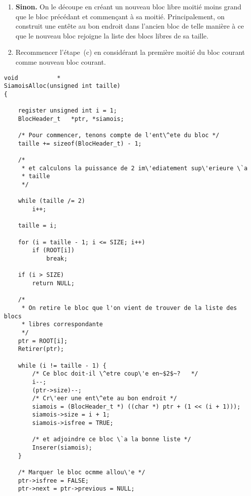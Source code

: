 \begin{enumerate}
\begin{enumerate}
    \verb+isfree+ \`a~$0$) et terminer la fonction en retournant un
    pointeur sur l'espace m\'emoire commen\c{c}ant juste apr\`es
    l'ent\^ete.
  \item \textbf{Sinon.}  On le d\'ecoupe en cr\'eant un nouveau bloc
    libre moiti\'e moins grand que le bloc pr\'ec\'edant et commen\c{c}ant
    \`a sa moiti\'e.  Principalement, on construit une ent\^ete au bon
    endroit dans l'ancien bloc de telle mani\`ere \`a ce que le
    nouveau bloc rejoigne la liste des blocs libres de sa taille.
  \item Recommencer l'\'etape~(c) en consid\'erant la premi\`ere
    moiti\'e du bloc courant comme nouveau bloc courant.
  \end{enumerate}
\ifcorrection
\begin{correction}
\newpage
\begin{verbatim}
void           *
SiamoisAlloc(unsigned int taille)
{

	register unsigned int i = 1;
	BlocHeader_t   *ptr, *siamois;

	/* Pour commencer, tenons compte de l'ent\^ete du bloc */
	taille += sizeof(BlocHeader_t) - 1;

	/*
	 * et calculons la puissance de 2 im\'ediatement sup\'erieure \`a
	 * taille
	 */

	while (taille /= 2)
		i++;

	taille = i;

	for (i = taille - 1; i <= SIZE; i++)
		if (ROOT[i])
			break;

	if (i > SIZE)
		return NULL;

	/*
	 * On retire le bloc que l'on vient de trouver de la liste des blocs
	 * libres correspondante
	 */
	ptr = ROOT[i];
	Retirer(ptr);

	while (i != taille - 1) {
		/* Ce bloc doit-il \^etre coup\'e en~$2$~?   */
		i--;
		(ptr->size)--;
		/* Cr\'eer une ent\^ete au bon endroit */
		siamois = (BlocHeader_t *) ((char *) ptr + (1 << (i + 1)));
		siamois->size = i + 1;
		siamois->isfree = TRUE;

		/* et adjoindre ce bloc \`a la bonne liste */
		Inserer(siamois);
	}

	/* Marquer le bloc ocmme allou\'e */
	ptr->isfree = FALSE;
	ptr->next = ptr->previous = NULL;


\end{verbatim}
\end{correction}
\end{enumerate}
